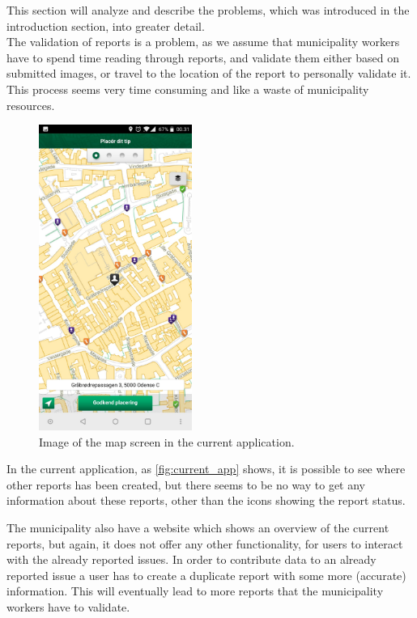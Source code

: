 This section will analyze and describe the problems, which was introduced in the introduction section, into greater detail. 
~\\

The validation of reports is a problem, as we assume that municipality workers have to spend time reading through reports, and validate them either based on submitted images, or travel to the location of the report to personally validate it. This process seems very time consuming and like a waste of municipality resources.

\begin{figure}[hbt]
\centering
\includegraphics[width=5cm]{images/giv_et_tip_current_scr}
\caption{Image of the map screen in the current application.} \label{fig:current_app}
\end{figure}

In the current application, as \autoref{fig:current_app} shows, it is possible to see where other reports has been created, but there seems to be no way to get any information about these reports, other than the icons showing the report status.

The municipality also have a website which shows an overview of the current reports, but again, it does not offer any other functionality, for users to interact with the already reported issues. In order to contribute data to an already reported issue a user has to create a duplicate report with some more (accurate) information. This will eventually lead to more reports that the municipality workers have to validate.
~\\

